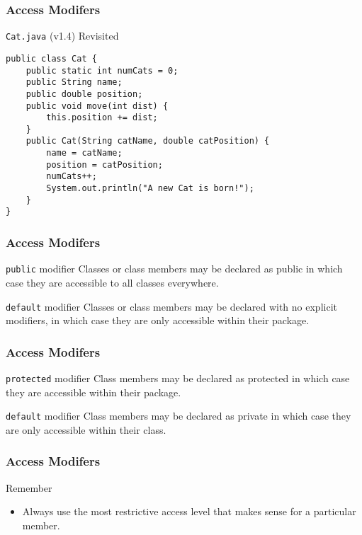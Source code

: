 \documentclass[10pt, compress]{beamer}
\begin{document}
\begin{frame}[fragile]
	\frametitle{Access Modifers}
	\begin{block}{\texttt{Cat.java} (v1.4) Revisited}
		\begin{verbatim}
public class Cat {
	public static int numCats = 0;
	public String name;
	public double position;
	public void move(int dist) {
		this.position += dist;
	}
	public Cat(String catName, double catPosition) {
		name = catName;
		position = catPosition;
		numCats++;
		System.out.println("A new Cat is born!");
	}
}
		\end{verbatim}
	\end{block}
\end{frame}

\begin{frame}[fragile]
	\frametitle{Access Modifers}
	\begin{block}{\texttt{public} modifier}
		Classes or class members may be declared as \alert{public} in which case they are accessible to all classes everywhere.
	\end{block}
	\begin{block}{\texttt{default} modifier}
		Classes or class members may be declared with no explicit modifiers, in which case they are only accessible within their package.
	\end{block}
\end{frame}

\begin{frame}[fragile]
	\frametitle{Access Modifers}
	\begin{block}{\texttt{protected} modifier}
		Class members may be declared as \alert{protected} in which case they are accessible within their package.
	\end{block}
	\begin{block}{\texttt{default} modifier}
		Class members may be declared as \alert{private} in which case they are only accessible within their class.
	\end{block}
\end{frame}

\begin{frame}[fragile]
	\frametitle{Access Modifers}
	\begin{block}{Remember}
		\begin{itemize}
		\item[] Always use the most restrictive access level that makes sense for a particular member.
		\end{itemize}
	\end{block}
\end{frame}
\end{document}
